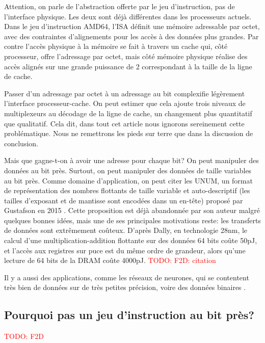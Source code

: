 \documentclass[architecture]{compas2018}
\newcommand{\todo}[1]{\textcolor{red}{TODO: #1}}
\begin{document}
Attention, on parle de l'abstraction offerte par le jeu d'instruction, pas de l'interface physique.
Les deux sont déjà différentes dans les processeurs actuels.
Dans le jeu d'instruction AMD64, l'ISA définit une mémoire adressable par octet, avec des contraintes d'alignements pour les accès à des données plus grandes.
Par contre l'accès physique à la mémoire se fait à travers un cache qui, côté processeur, offre l'adressage par octet, mais côté mémoire physique  réalise des accès alignés sur une grande puissance de 2 correspondant à la taille de la ligne de cache.

Passer d'un adressage par octet à un adressage au bit complexifie légèrement l'interface processeur-cache.
On peut estimer que cela ajoute trois niveaux de multiplexeurs au décodage de la ligne de cache, un changement plus quantitatif que qualitatif.
Cela dit, dans tout cet article nous ignorons sereinement cette problématique.
Nous ne remettrons les pieds sur terre que dans la discussion de conclusion.


Mais que gagne-t-on à avoir une adresse pour chaque bit?  On peut manipuler des données au bit près.
Surtout, on peut manipuler des données de taille variables au bit près.
Comme domaine d'application, on peut citer les UNUM, un format de représentation des nombres flottants de taille variable et auto-descriptif (les tailles d'exposant et de mantisse sont encodées dans un en-tête) proposé par  Gustafson en 2015 \cite{2015-02-GUSTAFSON}.
Cette proposition est déjà abandonnée par son auteur \cite{2016-09-TICHY} malgré quelques bonnes idées, mais une de ses principales motivations reste: les transferts de données sont extrêmement coûteux.
D'après Dally, en technologie 28nm, le calcul d'une multiplication-addition flottante sur des données 64 bits coûte 50pJ, et l'accès aux registres sur puce est du même ordre de grandeur, alors qu'une lecture de 64 bits de la DRAM coûte 4000pJ.
\todo{F2D: citation}

Il y a aussi des applications, comme les réseaux de neurones, qui se contentent très bien de données sur de très petites précision, voire des données binaires \cite{AndriCRB16,AlemdarEtAl2017:TernaryCNN,AmiriEtAl2018:mixedPrecCNN,Preusser:DATE2018:heteroCNN}. 

\subsection{Pourquoi pas un jeu d'instruction au bit près?}

\todo{F2D}
\end{document}
